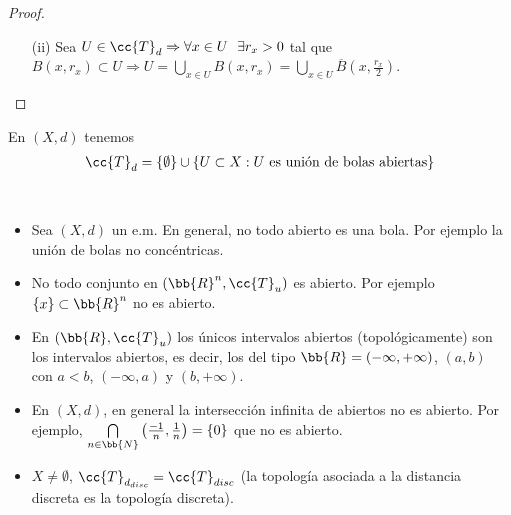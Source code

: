 \begin{prop}
\begin{proof}
\begin{enumerate}
\begin{center}
            \end{center}
            
            \item[(ii)] Sea $U \in \cc{T}_d \Rightarrow \forall x \in U \ \ \exists r_x >0$ tal que $B(x,r_x)\subset U \Rightarrow U = \bigcup\limits_{x\in U}B(x, r_x) = \bigcup\limits_{x\in U}\overline{B}\left(x, \frac{r_x}{2}\right)$.
            
        \end{enumerate}
    \end{proof}
\end{prop}

\begin{coro}
    En $(X,d)$ tenemos 
    \begin{gather*}
        \cc{T}_d=\{\emptyset\}\cup\{U \subset X : U \text{ es unión de bolas abiertas}\}
    \end{gather*}
    \endsquare
\end{coro}

\begin{ejemplo}\
    \begin{itemize}
        \item Sea $(X,d)$ un e.m. En general, no todo abierto es una bola. Por ejemplo la unión de bolas no concéntricas.
        \item No todo conjunto en $(\bb{R}^n, \cc{T}_u)$ es abierto. Por ejemplo $\{x\}\subset \bb{R}^n$ no es abierto.
        \item En $(\bb{R}, \cc{T}_u)$ los únicos intervalos abiertos (topológicamente) son los intervalos abiertos, es decir, los del tipo $\bb{R}=(-\infty, +\infty)$, $(a,b)$ con $a<b$, $(-\infty, a)$ y $(b, +\infty)$.
        \item En $(X, d)$, en general la intersección infinita de abiertos no es abierto. Por ejemplo, $\bigcap\limits_{n\in \bb{N}}\left(\frac{-1}{n}, \frac{1}{n}\right) = \{0\}$ que no es abierto.
        \item $X\neq \emptyset$, $\cc{T}_{d_{disc}}=\cc{T}_{disc}$ (la topología asociada a la distancia discreta es la topología discreta).
    \end{itemize}
    \endsquare
\end{ejemplo}

